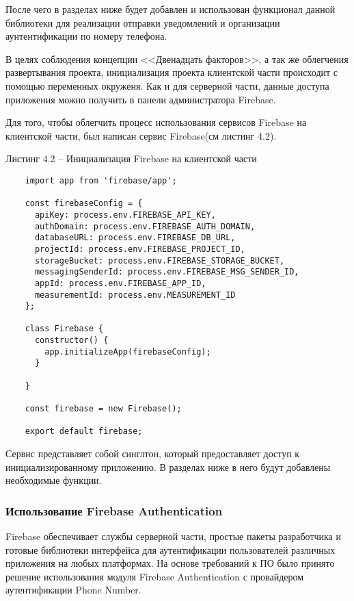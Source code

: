 После чего в разделах ниже будет добавлен и использован функционал данной библиотеки для реализации отправки уведомлений и организации аунтентификации по номеру телефона.


В целях соблюдения концепции <<Двенадцать факторов>>, а так же облегчения развертывания проекта, инициализация проекта клиентской части происходит с помощью переменных окруженя.
Как и для серверной части, данные доступа приложения можно получить в панели администратора Firebase.

Для того, чтобы облегчить процесс использования сервисов Firebase на клиентской части, был написан сервис Firebase(см листинг 4.2).

Листинг 4.2 – Инициализация Firebase на клиентской части
\begin{lstlisting}
    import app from 'firebase/app';

    const firebaseConfig = {
      apiKey: process.env.FIREBASE_API_KEY,
      authDomain: process.env.FIREBASE_AUTH_DOMAIN,
      databaseURL: process.env.FIREBASE_DB_URL,
      projectId: process.env.FIREBASE_PROJECT_ID,
      storageBucket: process.env.FIREBASE_STORAGE_BUCKET,
      messagingSenderId: process.env.FIREBASE_MSG_SENDER_ID,
      appId: process.env.FIREBASE_APP_ID,
      measurementId: process.env.MEASUREMENT_ID
    };

    class Firebase {
      constructor() {
        app.initializeApp(firebaseConfig);
      }

    }

    const firebase = new Firebase();

    export default firebase;

\end{lstlisting}

Сервис представляет собой синглтон, который предоставляет доступ к инициализированному приложению.
В разделах ниже в него будут добавлены необходимые функции.

\subsubsection{Использование Firebase Authentication}\hfill

Firebase обеспечивает службы серверной части, простые пакеты разработчика и готовые библиотеки интерфейса для аутентификации пользователей различных приложения на любых платформах.
На основе требований к ПО было принято решение использования модуля Firebase Authentication с провайдером аутентификации Phone Number.

